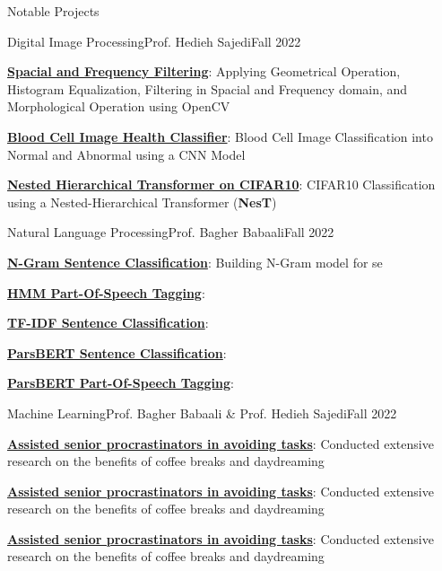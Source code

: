 \documentclass[]{main}
\begin{document}
\begin{section}{Notable Projects}
 \begin{subsection}{Digital Image Processing}{Prof. Hedieh Sajedi}{Fall 2022}{}
     \item \textbf{\href{https://github.com/ckoliber/dipexercises/blob/main/src/exercise1.ipynb}{Spacial and Frequency Filtering}}: Applying Geometrical Operation, Histogram Equalization, Filtering in Spacial and Frequency domain, and Morphological Operation using OpenCV
     \item \textbf{\href{https://github.com/ckoliber/dipexercises/blob/main/src/exercise2.ipynb}{Blood Cell Image Health Classifier}}: Blood Cell Image Classification into Normal and Abnormal using a CNN Model
     \item \textbf{\href{https://github.com/ckoliber/dipexercises/blob/main/src/project.ipynb}{Nested Hierarchical Transformer on CIFAR10}}: CIFAR10 Classification using a Nested-Hierarchical Transformer (\textbf{NesT})
 \end{subsection}

 \begin{subsection}{Natural Language Processing}{Prof. Bagher Babaali}{Fall 2022}{}
     \item \textbf{\href{https://github.com/ckoliber/nlpexercises/blob/main/src/exercise1.ipynb}{N-Gram Sentence Classification}}: Building N-Gram model for se
     \item \textbf{\href{https://github.com/ckoliber/nlpexercises/blob/main/src/exercise3.ipynb}{HMM Part-Of-Speech Tagging}}:
     \item \textbf{\href{https://github.com/ckoliber/nlpexercises/blob/main/src/exercise4.ipynb}{TF-IDF Sentence Classification}}:
     \item \textbf{\href{https://github.com/ckoliber/nlpexercises/blob/main/src/exercise5.ipynb}{ParsBERT Sentence Classification}}:
     \item \textbf{\href{https://github.com/ckoliber/nlpexercises/blob/main/src/exercise6.ipynb}{ParsBERT Part-Of-Speech Tagging}}:
 \end{subsection}

 \begin{subsection}{Machine Learning}{Prof. Bagher Babaali \& Prof. Hedieh Sajedi}{Fall 2022}{}
     \item \textbf{\href{https://google.com}{Assisted senior procrastinators in avoiding tasks}}: Conducted extensive research on the benefits of coffee breaks and daydreaming
     \item \textbf{\href{https://google.com}{Assisted senior procrastinators in avoiding tasks}}: Conducted extensive research on the benefits of coffee breaks and daydreaming
     \item \textbf{\href{https://google.com}{Assisted senior procrastinators in avoiding tasks}}: Conducted extensive research on the benefits of coffee breaks and daydreaming
 \end{subsection}


\end{section}
\end{document}
